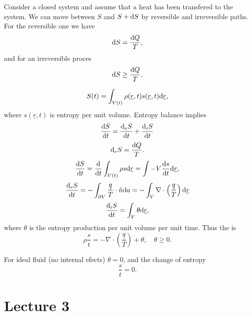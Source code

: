 \documentclass[11pt,oneside]{book}
\renewcommand{\vec}[1]{\underline{#1}}
\theoremstyle{definition} %
\theoremstyle{plain} %
\theoremstyle{remark} %
\theoremstyle{underline}
\begin{document}
  Consider a closed system and assume that a heat has been transfered to the system.
  We can move between $S$ and $S + \mathrm{d} S$ by reversible and irreversible paths.
  For the reversible one we have 
  \begin{displaymath}
    \mathrm{d} S  = \frac{\mathrm{d} Q}{T},
  \end{displaymath}
  and for an irreversible proces
  \begin{displaymath}
    \mathrm{d} S \geq \frac{\mathrm{d} Q}{T}.
  \end{displaymath}
  
  \begin{displaymath}
    S(t) = \int_{V(t)} \rho( \vec r , t) s( \vec r, t) \d \vec r,
  \end{displaymath}
  where $s(\vec r, t)$ is entropy per unit volume.
  Entropy balance implies
  \begin{displaymath}
    \frac{\mathrm{d} S}{\mathrm{d} t} = \frac{\mathrm{d}_e S}{\mathrm{d} t} + \frac{\mathrm{d}_i S}{\mathrm{d} t} 
  \end{displaymath}
  \begin{displaymath}
    \mathrm{d}_e S = \frac{\mathrm{d} Q}{T}.
  \end{displaymath}
  \begin{displaymath}
    \dfrac{S}{t} = \dfrac{}{t} \int_{V(t)} \rho s \d \vec r = \int-V \dfrac{s}{t} \d \vec r,
  \end{displaymath}
  \begin{displaymath}
    \dfrac{_e S}{t} = - \int_{\partial V} \frac{ \vec q}{T} \cdot \hat n \d a 
    = - \int_V \nabla \cdot \left( \frac{\vec q}{T} \right) \d \vec r
  \end{displaymath}
  \begin{displaymath}
    \dfrac{_i S}{t} = \int_V \theta \d \vec r,
  \end{displaymath}
  where $\theta$ is the entropy production per unit volume per unit time.
  Thus the  is
  \begin{displaymath}
    \rho \dfrac{s}{t} = - \nabla \cdot \left( \frac{\vec q }{T}  \right) + \theta, \quad \theta \geq 0.
  \end{displaymath}

  For ideal fluid (no internal efects) $\theta = 0$, and the change of entropy
  \begin{displaymath}
    \dfrac{s}{t} = 0.
  \end{displaymath}


  \chapter{Lecture 3}
\end{document}
